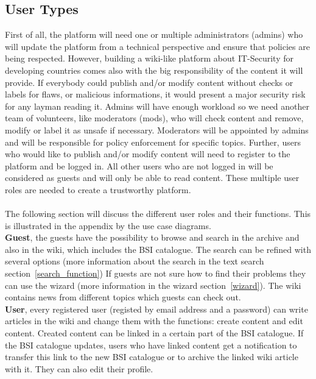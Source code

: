 \subsection{User Types} 
\label{user_types}
First of all, the platform will need one or multiple administrators (admins) who will update the platform from a technical perspective and ensure that policies are being respected. 
However, building a wiki-like platform about IT-Security for developing countries comes also with the big responsibility of the content it will provide. 
If everybody could publish and/or modify content without checks or labels for flaws, or malicious informations, it would present a major security risk for any layman reading it. 
Admins will have enough workload so we need another team of volunteers, like moderators (mods), who will check content and remove, modify or label it as unsafe if necessary. 
Moderators will be appointed by admins and will be responsible for policy enforcement for specific topics. 
Further, users who would like to publish and/or modify content will need to register to the platform and be logged in. 
All other users who are not logged in will be considered as guests and will only be able to read content. 
These multiple user roles are needed to create a trustworthy platform. 
\\\\
The following section will discuss the different user roles and their functions. 
This is illustrated in the appendix by the use case diagrams. 
\\
\textbf{Guest}, the guests have the possibility to browse and search in the archive and also in the wiki, which includes the BSI catalogue. The search can be refined with several options (more information about the search in the text search section~\ref{search_function}) 
If guests are not sure how to find their problems they can use the wizard (more information in the wizard section~\ref{wizard}). 
The wiki contains news from different topics which guests can check out.
\\
\textbf{User}, every registered user (registed by email address and a password) can write articles in the wiki and change them with the functions: create content and edit content. 
Created content can be linked in a certain part of the BSI catalogue. 
If the BSI catalogue updates, users who have linked content get a notification to transfer this link to the new BSI catalogue or to archive the linked wiki article with it.
They can also edit their profile. 
